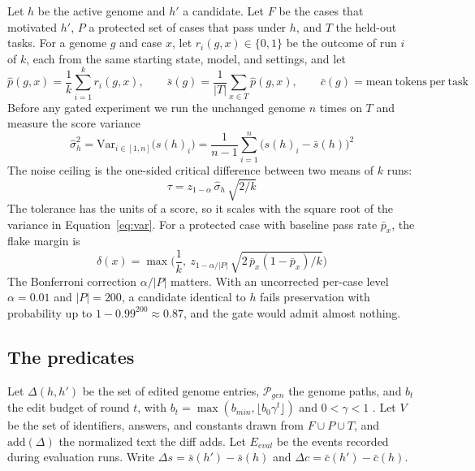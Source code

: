 \documentclass[11pt,a4paper]{article}
\begin{document}
Let $h$ be the active genome and $h'$ a candidate. Let $F$ be the cases that motivated $h'$, $P$ a protected set of cases that pass under $h$, and $T$ the held-out tasks. For a genome $g$ and case $x$, let $r_i(g,x)\in\{0,1\}$ be the outcome of run $i$ of $k$, each from the same starting state, model, and settings, and let
\begin{equation}
\hat p(g,x)=\frac{1}{k}\sum_{i=1}^{k} r_i(g,x),\qquad \bar s(g)=\frac{1}{|T|}\sum_{x\in T}\hat p(g,x),\qquad \bar c(g)=\mathrm{mean\ tokens\ per\ task}
\label{eq:rates}
\end{equation}
Before any gated experiment we run the unchanged genome $n$ times on $T$ and measure the score variance
\begin{equation}
\hat\sigma_h^2=\mathrm{Var}_{i\in[1,n]}\big(s(h)_i\big)=\frac{1}{n-1}\sum_{i=1}^{n}\big(s(h)_i-\bar s(h)\big)^2
\label{eq:var}
\end{equation}
The noise ceiling is the one-sided critical difference between two means of $k$ runs:
\begin{equation}
\tau = z_{1-\alpha}\,\hat\sigma_h\,\sqrt{2/k}
\label{eq:tau}
\end{equation}
The tolerance has the units of a score, so it scales with the square root of the variance in Equation~\eqref{eq:var}. For a protected case with baseline pass rate $\bar p_x$, the flake margin is
\begin{equation}
\delta(x)=\max\Big(\frac{1}{k},\ z_{1-\alpha/|P|}\,\sqrt{2\,\bar p_x(1-\bar p_x)/k}\Big)
\label{eq:delta}
\end{equation}
The Bonferroni correction $\alpha/|P|$ \citep{dunn1961multiple} matters. With an uncorrected per-case level $\alpha=0.01$ and $|P|=200$, a candidate identical to $h$ fails preservation with probability up to $1-0.99^{200}\approx 0.87$, and the gate would admit almost nothing.

\subsection{The predicates}

Let $\Delta(h,h')$ be the set of edited genome entries, $\mathcal{P}_{gen}$ the genome paths, and $b_t$ the edit budget of round $t$, with $b_t=\max(b_{min},\lfloor b_0\gamma^t\rfloor)$ and $0<\gamma<1$ \citep{xia2026rrsi}. Let $V$ be the set of identifiers, answers, and constants drawn from $F\cup P\cup T$, and $\mathrm{add}(\Delta)$ the normalized text the diff adds. Let $E_{eval}$ be the events recorded during evaluation runs. Write $\Delta s=\bar s(h')-\bar s(h)$ and $\Delta c=\bar c(h')-\bar c(h)$.
\end{document}

